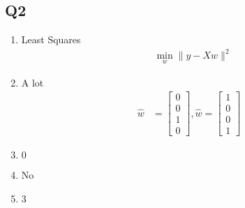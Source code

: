\documentclass{article}
\begin{document}
\subsection{Q2}
\begin{enumerate}
\item Least Squares
\begin{align*}
&\displaystyle\min_{w} \| y - X w \|^{2}
\end{align*}
\item A lot
\begin{align*}
\hat{w} &= \begin{bmatrix} 0 \\ 0 \\ 1 \\ 0 \end{bmatrix} , \hat{w} = \begin{bmatrix} 1 \\ 0 \\ 0 \\ 1 \end{bmatrix}
\end{align*}
\item $0$
\end{enumerate}

\begin{enumerate}
\setcounter{enumii}{3}
\item No
\end{enumerate}

\begin{enumerate}
\setcounter{enumii}{4}
\item $3$
\end{enumerate}
\end{document}
